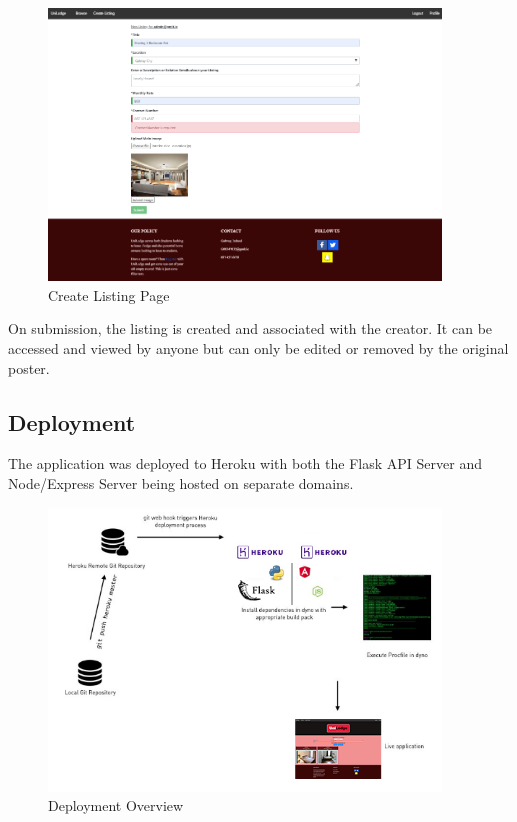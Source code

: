 \begin{figure}[H]
	\caption{Create Listing Page}
	\label{image:userprofile}
	\centering
	\includegraphics[width=0.93\textwidth]{images/new_listing.png}
\end{figure}

On submission, the listing is created and associated with the creator. It can be accessed and viewed by anyone but can only be edited or removed by the original poster. 

\subsection{Deployment}
The application was deployed to Heroku with both the Flask API Server and Node/Express Server being hosted on separate domains.

\begin{figure}[H]
	\caption{Deployment Overview}
	\label{image:deploy}
	\centering
	\includegraphics[width=0.93\textwidth]{images/deploy.png}
\end{figure}

